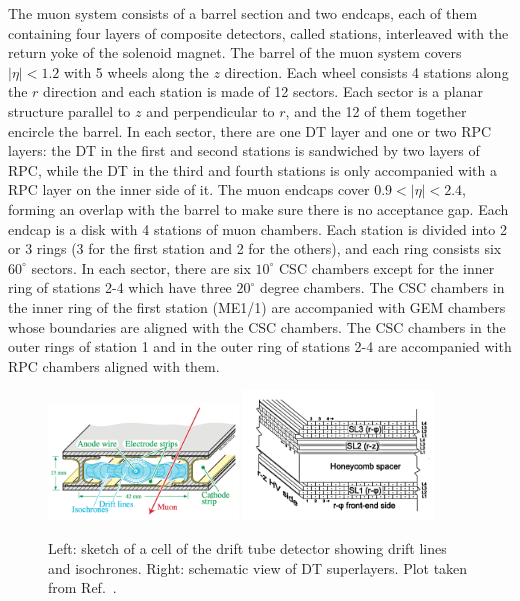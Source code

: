 The muon system consists of a barrel section and two endcaps, each of them containing four layers of composite detectors, 
called stations, interleaved with the return yoke of the solenoid magnet.
The barrel of the muon system covers $|\eta| < 1.2$ with 5 wheels along the $z$ direction.
Each wheel consists 4 stations along the $r$ direction and each station is made of 12 sectors.
Each sector is a planar structure parallel to $z$ and perpendicular to $r$, 
and the 12 of them together encircle the barrel.
In each sector, there are one DT layer and one or two RPC layers: the DT in the first and second stations is sandwiched by two layers of RPC,
while the DT in the third and fourth stations is only accompanied with a RPC layer on the inner side of it.
The muon endcaps cover $0.9 < |\eta| < 2.4$, forming an overlap with the barrel to make sure there is no acceptance gap.
Each endcap is a disk with 4 stations of muon chambers.
Each station is divided into 2 or 3 rings (3 for the first station and 2 for the others), and each ring consists six $60^\circ$ sectors.
In each sector, there are six $10^\circ$ CSC chambers except for the inner ring of stations 2-4 which have three $20^\circ$ degree chambers.
The CSC chambers in the inner ring of the first station (ME1/1) are accompanied with GEM chambers whose boundaries are aligned with the CSC chambers.
The CSC chambers in the outer rings of station 1 and in the outer ring of stations 2-4 are accompanied with RPC chambers aligned with them.

\begin{figure}[!htb]
    \centering
    \captionsetup{justification=justified}
    \includegraphics[width=0.45\textwidth]{pics/LHC_CMS/DT.png}
    \includegraphics[width=0.45\textwidth]{pics/LHC_CMS/DT_superlayer.png}
    \caption{Left: sketch of a cell of the drift tube detector showing drift lines and isochrones.
             Right: schematic view of DT superlayers.
             Plot taken from Ref.~\cite{collaboration_2013}.}
    \label{fig:cms_dt}
\end{figure}

